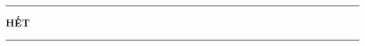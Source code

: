 
\fileend


\begin{center}
	\rule[4pt]{2cm}{1pt}\large \textbf{HẾT}\rule[4pt]{2cm}{1pt}
\end{center}











